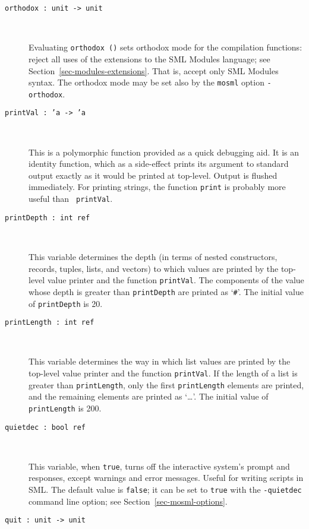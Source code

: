 \documentclass[fleqn]{article}
\begin{document}
\begin{description}
\item[{\tt orthodox :\ unit -> unit}]\mbox{ }
  
  Evaluating \texttt{orthodox ()} sets orthodox mode for the
  compilation functions: reject all uses of the extensions to the SML
  Modules language; see Section~\ref{sec-modules-extensions}.  That
  is, accept only SML Modules syntax.  The orthodox mode may be set
  also by the \texttt{mosml} option \texttt{-orthodox}.

\item[{\tt printVal :\ 'a -> 'a}]\mbox{ }

  This is a polymorphic function provided as a quick debugging aid.
  It is an identity function, which as a side-effect prints its
  argument to standard output exactly as it would be printed at
  top-level.  Output is flushed immediately.  For printing strings,
  the function {\tt print} is probably more useful than {\tt
    printVal}.

\item[{\tt printDepth :\ int ref}]\mbox{ }

  This variable determines the depth (in terms of nested constructors,
  records, tuples, lists, and vectors) to which values are printed by
  the top-level value printer and the function {\tt printVal}. The
  components of the value whose depth is greater than {\tt printDepth}
  are printed as `{\tt \#}'.  The initial value of {\tt printDepth} is
  20. 

\item[{\tt printLength :\ int ref}]\mbox{ }

  This variable determines the way in which list values are printed by
  the top-level value printer and the function {\tt printVal}. If the
  length of a list is greater than {\tt printLength}, only the first
  {\tt printLength} elements are printed, and the remaining elements
  are printed as `\ldots'.  The initial value of {\tt printLength} is
  200.

\item[{\tt quietdec :\ bool ref}]\mbox{ }

  This variable, when {\tt true}, turns off the interactive system's
  prompt and responses, except warnings and error messages.  Useful
  for writing scripts in SML\@.  The default value is {\tt false}; it
  can be set to {\tt true} with the {\tt -quietdec} command line
  option; see Section~\ref{sec-mosml-options}.

\item[{\tt quit :\ unit -> unit}]\mbox{ }


\end{description}
\end{document}
